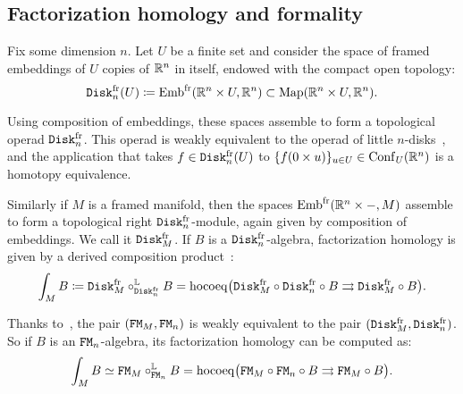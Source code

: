 \subsection{Factorization homology and formality}
\label{cnf.sec.fact-homol}

Fix some dimension $n$.
Let $U$ be a finite set and consider the space of framed embeddings of $U$ copies of $\mathbb{R}^{n}$ in itself, endowed with the compact open topology:
\begin{equation}
  \mathtt{Disk}_{n}^{\mathrm{fr}}(U) \coloneqq  \operatorname{Emb}^{\mathrm{fr}}(\mathbb{R}^{n} \times U, \mathbb{R}^{n}) \subset \operatorname{Map}(\mathbb{R}^{n} \times U, \mathbb{R}^{n}).
\end{equation}

Using composition of embeddings, these spaces assemble to form a topological operad $\mathtt{Disk}_{n}^{\mathrm{fr}}$.
This operad is weakly equivalent to the operad of little $n$-disks~\cite[Remark 2.10]{AyalaFrancis2015}, and the application that takes $f \in \mathtt{Disk}_{n}^{\mathrm{fr}}(U)$ to $\{ f(0 \times u) \}_{u \in U} \in \operatorname{Conf}_{U}(\mathbb{R}^{n})$ is a homotopy equivalence.

Similarly if $M$ is a framed manifold, then the spaces $\operatorname{Emb}^{\mathrm{fr}}(\mathbb{R}^{n} \times -, M)$ assemble to form a topological right $\mathtt{Disk}_{n}^{\mathrm{fr}}$-module, again given by composition of embeddings.
We call it $\mathtt{Disk}_{M}^{\mathrm{fr}}$.
If $B$ is a $\mathtt{Disk}_{n}^{\mathrm{fr}}$-algebra, factorization homology is given by a derived composition product~\cite[Definition 3.2]{AyalaFrancis2015}:
\begin{equation}
  \int_{M} B \coloneqq \mathtt{Disk}_{M}^{\mathrm{fr}} \circ_{\mathtt{Disk}_{n}^{\mathrm{fr}}}^{\mathbb{L}} B = \operatorname{hocoeq} \bigl( \mathtt{Disk}_{M}^{\mathrm{fr}} \circ \mathtt{Disk}_{n}^{\mathrm{fr}} \circ B \rightrightarrows \mathtt{Disk}_{M}^{\mathrm{fr}} \circ B \bigr).
\end{equation}

Thanks to~\cite[Section 2]{Turchin2013}, the pair $(\mathtt{FM}_{M}, \mathtt{FM}_{n})$ is weakly equivalent to the pair $(\mathtt{Disk}_{M}^{\mathrm{fr}}, \mathtt{Disk}_{n}^{\mathrm{fr}})$.
So if $B$ is an $\mathtt{FM}_{n}$-algebra, its factorization homology can be computed as:
\begin{equation}
  \label{cnf.eq:15}
  \int_{M} B \simeq \mathtt{FM}_{M} \circ_{\mathtt{FM}_{n}}^{\mathbb{L}} B = \operatorname{hocoeq} \bigl( \mathtt{FM}_{M} \circ \mathtt{FM}_{n} \circ B \rightrightarrows \mathtt{FM}_{M} \circ B \bigr).
\end{equation}

